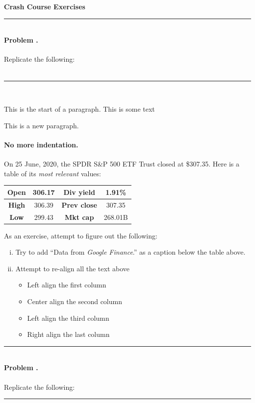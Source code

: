 \documentclass[11pt,a4paper]{article}
\newcommand{\coursenum}{Crash Course Exercises}
\newcounter{problem}
\newcommand\Problem{
  \stepcounter{problem}
  {\large \textbf{Problem \theproblem.}~}
}
\begin{document}
\textbf{\coursenum \hfill}\\
\noindent\rule{\textwidth}{1pt} \\
\Problem \\\\
Replicate the following:\\\\
\noindent\rule{\textwidth}{.4pt} \\
\par
This is the start of a paragraph. This is some text 
\par
This is a new paragraph. \\\\
\textbf{No more indentation.}\\\\
On 25 June, 2020, the SPDR S\&P 500 ETF Trust closed at \$307.35. Here is a table of its \emph{most relevant} values:

\begin{center}
    \begin{tabular}{cc|cc}
        \textbf{Open} & 306.17 & \textbf{Div yield} & 1.91\% \\
        \hline 
        \textbf{High} & 306.39 & \textbf{Prev close} & 307.35 \\
        \hline 
        \textbf{Low} & 299.43 & \textbf{Mkt cap} & 268.01B
    \end{tabular}
\end{center}
As an exercise, attempt to figure out the following:
\begin{enumerate}[(i)]
\item
    Try to add ``Data from \emph{Google Finance}.'' as a caption below the table above. 
    
\item
    Attempt to re-align all the text above
    \begin{itemize}
        \item 
        Left align the first column
        \item
        Center align the second column
        \item
        Left align the third column
        \item
        Right align the last column
    \end{itemize}
\end{enumerate}

\pagebreak
\noindent\rule{\textwidth}{1pt} \\
\Problem \\\\
Replicate the following: \\
\noindent\rule{\textwidth}{.4pt} \\
\end{document}
